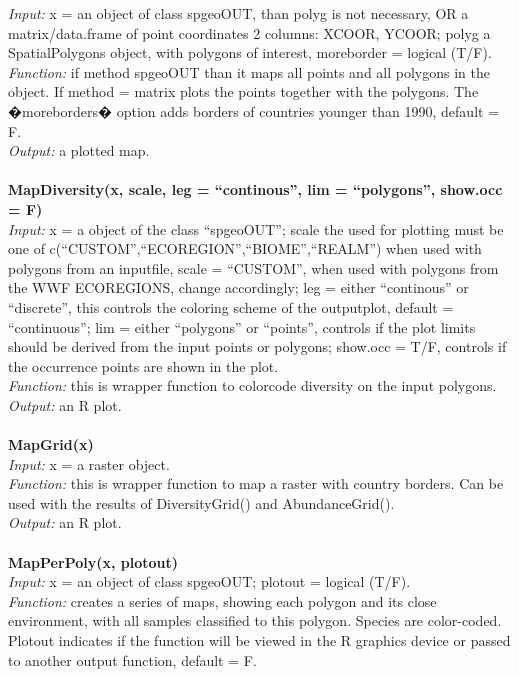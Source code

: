 \documentclass[a4paper,titlepage,11pt]{scrreprt}
\begin{document}
\textit{Input:} x = an object of class spgeoOUT, than polyg is not necessary, OR a matrix/data.frame of point coordinates 2 columns: XCOOR, YCOOR; polyg a SpatialPolygons object, with polygons of interest, moreborder = logical (T/F).\\
\textit{Function:} if method spgeoOUT than it maps all points and all polygons in the object. If method = matrix plots the points together with the polygons. The �moreborders� option adds borders of countries younger than 1990, default = F.\\
\textit{Output:} a plotted map.\\
\\
\textbf{MapDiversity(x, scale, leg = ``continous'', lim = ``polygons'', show.occ = F)}\\
\textit{Input:} x = a object of the class ``spgeoOUT''; scale the used for plotting must be one of c(``CUSTOM'',``ECOREGION'',``BIOME'',``REALM'') when used with polygons from an inputfile, scale = ``CUSTOM'', when used with polygons from the WWF ECOREGIONS, change accordingly; leg = either ``continous'' or ``discrete'', this controls the coloring scheme of the outputplot, default = ``continuous''; lim = either ``polygons'' or ``points'', controls if the plot limits should be derived from the input points or polygons; show.occ = T/F, controls if the occurrence points are shown in the plot.\\
\textit{Function:} this is wrapper function to colorcode diversity on the input polygons.\\
\textit{Output:} an R plot.\\
\\
\textbf{MapGrid(x)}\\
\textit{Input:} x = a raster object.\\
\textit{Function:} this is wrapper function to map a raster with country borders. Can be used with the results of DiversityGrid() and AbundanceGrid().\\
\textit{Output:} an R plot.\\
\\
\textbf{MapPerPoly(x, plotout)}\\
\textit{Input:} x = an object of class spgeoOUT; plotout = logical (T/F).\\
\textit{Function:} creates a series of maps, showing each polygon and its close environment, with all samples classified to this polygon. Species are color-coded. Plotout indicates if the function will be viewed in the R graphics device or passed to another output function, default = F. \\
\end{document}
